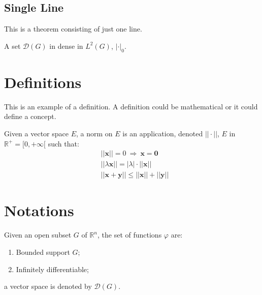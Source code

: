 \subsection{Single Line}
This is a theorem consisting of just one line.

\begin{theorem}
	A set $\mathcal{D}(G)$ in dense in $L^2(G)$, $|\cdot|_0$. 
\end{theorem}


\section{Definitions}

This is an example of a definition. A definition could be mathematical or it could define a concept.

\begin{definition}
	Given a vector space $E$, a norm on $E$ is an application, denoted $||\cdot||$, $E$ in $\mathbb{R}^+=[0,+\infty[$ such that:
	\begin{align}
		& ||\mathbf{x}||=0\ \Rightarrow\ \mathbf{x}=\mathbf{0}\\
		& ||\lambda \mathbf{x}||=|\lambda|\cdot ||\mathbf{x}||\\
		& ||\mathbf{x}+\mathbf{y}||\leq ||\mathbf{x}||+||\mathbf{y}||
	\end{align}
\end{definition}


\section{Notations}

\begin{notation}
	Given an open subset $G$ of $\mathbb{R}^n$, the set of functions $\varphi$ are:
	\begin{enumerate}
		\item Bounded support $G$;
		\item Infinitely differentiable;
	\end{enumerate}
	a vector space is denoted by $\mathcal{D}(G)$. 
\end{notation}


